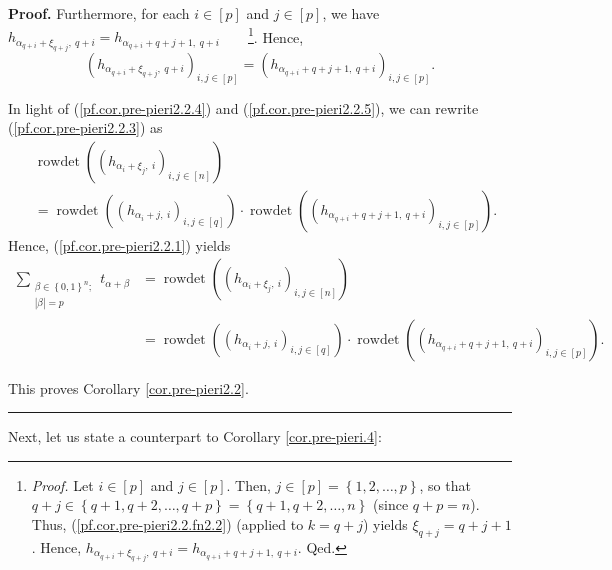 \documentclass[numbers=enddot,12pt,final,onecolumn,notitlepage,english]{scrartcl}%
\theoremstyle{definition}
\newenvironment{proof}[1][Proof]{\noindent\textbf{#1.} }{\ \rule{0.5em}{0.5em}}
\let\sumnonlimits\sum
\renewcommand{\sum}{\sumnonlimits\limits}
\newenvironment{verlong}{}{}
\begin{document}
\begin{proof}
\begin{verlong}
Furthermore, for each $i\in\left[  p\right]  $ and $j\in\left[  p\right]  $,
we have $h_{\alpha_{q+i}+\xi_{q+j},\ q+i}=h_{\alpha_{q+i}+q+j+1,\ q+i}%
$\ \ \ \ \footnote{\textit{Proof.} Let $i\in\left[  p\right]  $ and
$j\in\left[  p\right]  $. Then, $j\in\left[  p\right]  =\left\{
1,2,\ldots,p\right\}  $, so that $q+j\in\left\{  q+1,q+2,\ldots,q+p\right\}
=\left\{  q+1,q+2,\ldots,n\right\}  $ (since $q+p=n$). Thus,
(\ref{pf.cor.pre-pieri2.2.fn2.2}) (applied to $k=q+j$) yields $\xi
_{q+j}=q+j+1$. Hence, $h_{\alpha_{q+i}+\xi_{q+j},\ q+i}=h_{\alpha
_{q+i}+q+j+1,\ q+i}$. Qed.}. Hence,%
\begin{equation}
\left(  h_{\alpha_{q+i}+\xi_{q+j},\ q+i}\right)  _{i,j\in\left[  p\right]
}=\left(  h_{\alpha_{q+i}+q+j+1,\ q+i}\right)  _{i,j\in\left[  p\right]  }.
\label{pf.cor.pre-pieri2.2.5}%
\end{equation}


In light of (\ref{pf.cor.pre-pieri2.2.4}) and (\ref{pf.cor.pre-pieri2.2.5}),
we can rewrite (\ref{pf.cor.pre-pieri2.2.3}) as%
\begin{align*}
&  \operatorname*{rowdet}\left(  \left(  h_{\alpha_{i}+\xi_{j},\ i}\right)
_{i,j\in\left[  n\right]  }\right) \\
&  =\operatorname*{rowdet}\left(  \left(  h_{\alpha_{i}+j,\ i}\right)
_{i,j\in\left[  q\right]  }\right)  \cdot\operatorname*{rowdet}\left(  \left(
h_{\alpha_{q+i}+q+j+1,\ q+i}\right)  _{i,j\in\left[  p\right]  }\right)  .
\end{align*}
Hence, (\ref{pf.cor.pre-pieri2.2.1}) yields%
\begin{align*}
\sum_{\substack{\beta\in\left\{  0,1\right\}  ^{n};\\\left\vert \beta
\right\vert =p}}t_{\alpha+\beta}  &  =\operatorname*{rowdet}\left(  \left(
h_{\alpha_{i}+\xi_{j},\ i}\right)  _{i,j\in\left[  n\right]  }\right) \\
&  =\operatorname*{rowdet}\left(  \left(  h_{\alpha_{i}+j,\ i}\right)
_{i,j\in\left[  q\right]  }\right)  \cdot\operatorname*{rowdet}\left(  \left(
h_{\alpha_{q+i}+q+j+1,\ q+i}\right)  _{i,j\in\left[  p\right]  }\right)  .
\end{align*}

\end{verlong}

\noindent This proves Corollary \ref{cor.pre-pieri2.2}.
\end{proof}

Next, let us state a counterpart to Corollary \ref{cor.pre-pieri.4}:
\end{document}
